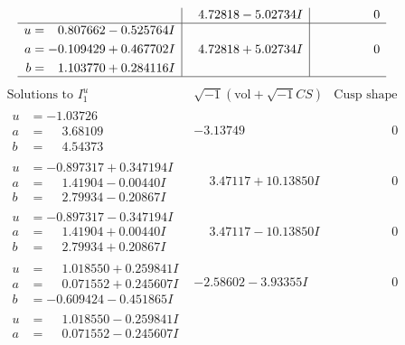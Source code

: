 \documentclass[1p]{elsarticle_modified}
\theoremstyle{definition}
\newcommand{\I}{\sqrt{-1}}
\begin{document}
$$\begin{array}{c|c|c}
 & \phantom{-}4.72818 - 5.02734 I & \phantom{-0.000000 } 0 \\ \hline\begin{aligned}
u &= \phantom{-}0.807662 - 0.525764 I \\
a &= -0.109429 + 0.467702 I \\
b &= \phantom{-}1.103770 + 0.284116 I\end{aligned}
 & \phantom{-}4.72818 + 5.02734 I & \phantom{-0.000000 } 0\\
 \hline 
 \end{array}$$\newpage$$\begin{array}{c|c|c}  
\text{Solutions to }I^u_{1}& \I (\text{vol} + \sqrt{-1}CS) & \text{Cusp shape}\\
 \hline 
\begin{aligned}
u &= -1.03726\phantom{ +0.000000I} \\
a &= \phantom{-}3.68109\phantom{ +0.000000I} \\
b &= \phantom{-}4.54373\phantom{ +0.000000I}\end{aligned}
 & -3.13749\phantom{ +0.000000I} & \phantom{-0.000000 } 0 \\ \hline\begin{aligned}
u &= -0.897317 + 0.347194 I \\
a &= \phantom{-}1.41904 - 0.00440 I \\
b &= \phantom{-}2.79934 - 0.20867 I\end{aligned}
 & \phantom{-}3.47117 + 10.13850 I & \phantom{-0.000000 } 0 \\ \hline\begin{aligned}
u &= -0.897317 - 0.347194 I \\
a &= \phantom{-}1.41904 + 0.00440 I \\
b &= \phantom{-}2.79934 + 0.20867 I\end{aligned}
 & \phantom{-}3.47117 - 10.13850 I & \phantom{-0.000000 } 0 \\ \hline\begin{aligned}
u &= \phantom{-}1.018550 + 0.259841 I \\
a &= \phantom{-}0.071552 + 0.245607 I \\
b &= -0.609424 - 0.451865 I\end{aligned}
 & -2.58602 - 3.93355 I & \phantom{-0.000000 } 0 \\ \hline\begin{aligned}
u &= \phantom{-}1.018550 - 0.259841 I \\
a &= \phantom{-}0.071552 - 0.245607 I \\

\end{aligned}
\end{array}$$
\end{document}
